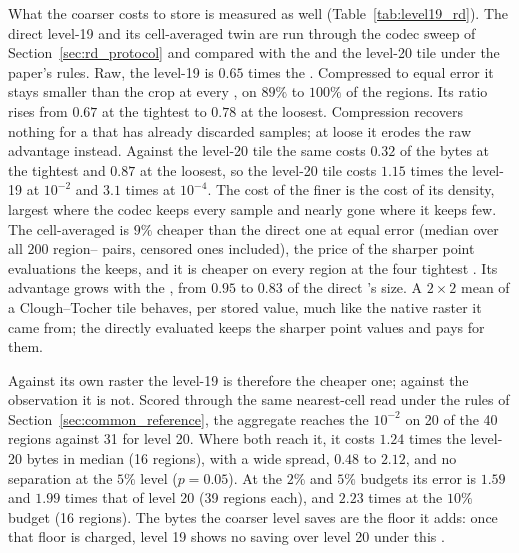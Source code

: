 

What the coarser  costs to store is measured as well
(Table~\ref{tab:level19_rd}). The direct level-19  and its
cell-averaged twin are run through the codec sweep of
Section~\ref{sec:rd_protocol} and compared with the  and the
level-20 tile under the paper's rules. Raw, the level-19  is
$0.65$ times the . Compressed to equal error it stays smaller
than the crop at every , on $89\%$ to $100\%$ of the regions. Its
ratio rises from $0.67$ at the tightest  to $0.78$ at the loosest.
Compression recovers nothing for a  that has already discarded
samples; at loose  it erodes the raw advantage instead.
Against the level-20 tile the same  costs $0.32$ of the bytes at
the tightest  and $0.87$ at the loosest, so the level-20 tile
costs $1.15$ times the level-19  at $10^{-2}$ and $3.1$ times at
$10^{-4}$. The cost of the finer  is the cost of its density,
largest where the codec keeps every sample and nearly gone where it
keeps few. The cell-averaged  is $9\%$ cheaper than the direct
one at equal error (median over all $200$ region-- pairs, censored ones
included), the price
of the sharper point evaluations the  keeps, and it is cheaper
on every region at the four tightest . Its advantage grows with
the , from $0.95$ to $0.83$ of the direct 's size.  A
$2\times2$ mean of a Clough--Tocher tile behaves, per stored value, much
like the native raster it came from; the directly evaluated 
keeps the sharper point values and pays for them.

Against its own raster the level-19  is therefore the
cheaper one; against the observation it is not. Scored through the same
nearest-cell read under the rules of
Section~\ref{sec:common_reference}, the aggregate reaches the $10^{-2}$
 on 20 of the 40 regions against 31 for level 20. Where
both reach it, it costs $1.24$ times the level-20 bytes in median (16 regions), with a wide spread, $0.48$ to $2.12$, and no separation at
the $5\%$ level ($p=0.05$). At the $2\%$ and $5\%$ budgets its error is $1.59$ and $1.99$ times that of level 20 (39 regions each), and
$2.23$ times at the $10\%$ budget (16 regions). The bytes the coarser
level saves are the floor it adds: once that floor is charged, level 19
shows no saving over level 20 under this .
